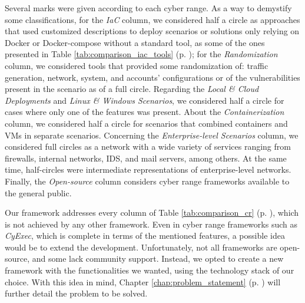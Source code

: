 Several marks were given according to each cyber range. As a way to demystify some classifications, for the \textit{IaC} column, we considered half a circle as approaches that used customized descriptions to deploy scenarios or solutions only relying on Docker or Docker-compose without a standard tool, as some of the ones presented in Table \ref{tab:comparison_iac_tools} (p. \pageref{tab:comparison_iac_tools}); for the \textit{Randomization} column, we considered tools that provided some randomization of: traffic generation, network, system, and accounts' configurations or of the vulnerabilities present in the scenario as of a full circle. Regarding the \textit{Local \& Cloud Deployments} and \textit{Linux \& Windows Scenarios}, we considered half a circle for cases where only one of the features was present. About the \textit{Containerization} column, we considered half a circle for scenarios that combined containers and VMs in separate scenarios. Concerning the \textit{Enterprise-level Scenarios} column, we considered full circles as a network with a wide variety of services ranging from firewalls, internal networks, IDS, and mail servers, among others. At the same time, half-circles were intermediate representations of enterprise-level networks. Finally, the \textit{Open-source} column considers cyber range frameworks available to the general public.

Our framework addresses every column of Table \ref{tab:comparison_cr} (p. \pageref{tab:comparison_cr}), which is not achieved by any other framework. Even in cyber range frameworks such as \textit{CyExec}, which is complete in terms of the mentioned features, a possible idea would be to extend the development. Unfortunately, not all frameworks are open-source, and some lack community support. Instead, we opted to create a new framework with the functionalities we wanted, using the technology stack of our choice. With this idea in mind, Chapter \ref{chap:problem_statement} (p. \pageref{chap:problem_statement}) will further detail the problem to be solved.